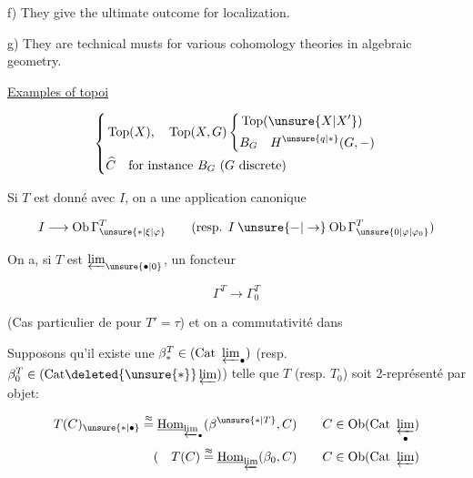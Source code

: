 f) They give the ultimate outcome for  localization.

g) They are technical musts for various cohomology theories
in algebraic geometry.

\uline{Examples of topoi}

\[
\left\{\begin{aligned}
&\operatorname{Top}(X),\quad \operatorname{Top}(X,G)
 \left\{\begin{aligned}&\operatorname{Top}(\unsure{X|X'})\\&B_G\quad H^{\unsure{q|*}}(G,-)\end{aligned}\right.\\
&\widehat C\quad\text{for instance }B_G\ (G\text{ discrete})
\end{aligned}\right.
\]

Si $T$ est donné avec $I$, on a une application canonique

\[
 I\longrightarrow\mathrm{Ob}\,\Gamma^{T}_{\unsure{*|\xi|\varphi}}
 \qquad(\text{resp. }I\mathbin{\unsure{-|\to}}\mathrm{Ob}\,\Gamma_{\unsure{0|\varphi|\varphi_0}}^{T})
\]

On a, si $T$ est  $\varprojlim_{\unsure{\bullet|0}}$, un foncteur

\[
\Gamma^{T}\longrightarrow\Gamma_0^{T}
\]

(Cas particulier de \hspace{1em} pour $T'=\tau$) et on a
commutativité dans


\uline{} Supposons qu'il existe une $\beta^{T}_{*}\in(\mathrm{Cat}\ \varprojlim_{\bullet})$
(resp. $\beta^{T}_0\in(\mathrm{Cat}\deleted{\unsure{*}}\varprojlim)$) telle que $T$ (resp. $T_0$)
soit  2-représenté par  objet:

\[
\begin{aligned}
T(C)_{\unsure{*|\bullet}}\mathrel{\mathop{=}^{\approx}}\underline{\mathrm{Hom}}_{\varprojlim_{\bullet}}(\beta^{\unsure{*|T}},C)
&\qquad C\in\mathrm{Ob}(\mathrm{Cat}\ \varprojlim_{\bullet})\\
(\quad T(C)\mathrel{\mathop{=}^{\approx}}\underline{\mathrm{Hom}}_{\varprojlim}(\beta_0,C)
&\qquad C\in\mathrm{Ob}(\mathrm{Cat}\ \varprojlim)
\end{aligned}
\]

